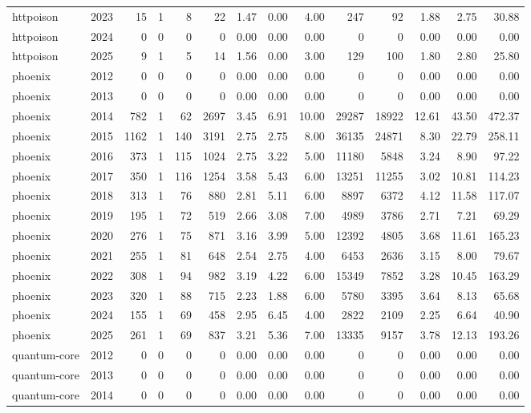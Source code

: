 \begin{table}[htbp]
\begin{tabular}{lrrrrrrrrrrrrr}
httpoison & 2023 & 15 & 1 & 8 & 22 & 1.47 & 0.00 & 4.00 & 247 & 92 & 1.88 & 2.75 & 30.88 \\
httpoison & 2024 & 0 & 0 & 0 & 0 & 0.00 & 0.00 & 0.00 & 0 & 0 & 0.00 & 0.00 & 0.00 \\
httpoison & 2025 & 9 & 1 & 5 & 14 & 1.56 & 0.00 & 3.00 & 129 & 100 & 1.80 & 2.80 & 25.80 \\
phoenix & 2012 & 0 & 0 & 0 & 0 & 0.00 & 0.00 & 0.00 & 0 & 0 & 0.00 & 0.00 & 0.00 \\
phoenix & 2013 & 0 & 0 & 0 & 0 & 0.00 & 0.00 & 0.00 & 0 & 0 & 0.00 & 0.00 & 0.00 \\
phoenix & 2014 & 782 & 1 & 62 & 2697 & 3.45 & 6.91 & 10.00 & 29287 & 18922 & 12.61 & 43.50 & 472.37 \\
phoenix & 2015 & 1162 & 1 & 140 & 3191 & 2.75 & 2.75 & 8.00 & 36135 & 24871 & 8.30 & 22.79 & 258.11 \\
phoenix & 2016 & 373 & 1 & 115 & 1024 & 2.75 & 3.22 & 5.00 & 11180 & 5848 & 3.24 & 8.90 & 97.22 \\
phoenix & 2017 & 350 & 1 & 116 & 1254 & 3.58 & 5.43 & 6.00 & 13251 & 11255 & 3.02 & 10.81 & 114.23 \\
phoenix & 2018 & 313 & 1 & 76 & 880 & 2.81 & 5.11 & 6.00 & 8897 & 6372 & 4.12 & 11.58 & 117.07 \\
phoenix & 2019 & 195 & 1 & 72 & 519 & 2.66 & 3.08 & 7.00 & 4989 & 3786 & 2.71 & 7.21 & 69.29 \\
phoenix & 2020 & 276 & 1 & 75 & 871 & 3.16 & 3.99 & 5.00 & 12392 & 4805 & 3.68 & 11.61 & 165.23 \\
phoenix & 2021 & 255 & 1 & 81 & 648 & 2.54 & 2.75 & 4.00 & 6453 & 2636 & 3.15 & 8.00 & 79.67 \\
phoenix & 2022 & 308 & 1 & 94 & 982 & 3.19 & 4.22 & 6.00 & 15349 & 7852 & 3.28 & 10.45 & 163.29 \\
phoenix & 2023 & 320 & 1 & 88 & 715 & 2.23 & 1.88 & 6.00 & 5780 & 3395 & 3.64 & 8.13 & 65.68 \\
phoenix & 2024 & 155 & 1 & 69 & 458 & 2.95 & 6.45 & 4.00 & 2822 & 2109 & 2.25 & 6.64 & 40.90 \\
phoenix & 2025 & 261 & 1 & 69 & 837 & 3.21 & 5.36 & 7.00 & 13335 & 9157 & 3.78 & 12.13 & 193.26 \\
quantum-core & 2012 & 0 & 0 & 0 & 0 & 0.00 & 0.00 & 0.00 & 0 & 0 & 0.00 & 0.00 & 0.00 \\
quantum-core & 2013 & 0 & 0 & 0 & 0 & 0.00 & 0.00 & 0.00 & 0 & 0 & 0.00 & 0.00 & 0.00 \\
quantum-core & 2014 & 0 & 0 & 0 & 0 & 0.00 & 0.00 & 0.00 & 0 & 0 & 0.00 & 0.00 & 0.00 \\

\end{tabular}
\end{table}
